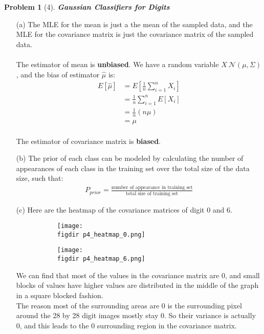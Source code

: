 \documentclass[11pt]{article}
\theoremstyle{quest}
\newtheorem*{question}{Problem}
\newcommand{\figdir}{../figures/}
\begin{document}
\begin{question}[4]
\textbf{Gaussian Classifiers for Digits}
\end{question}
\begin{itemize}
\item[(a)]
The MLE for the mean is just a the mean of the sampled data, and the MLE for the covariance matrix is just the covariance matrix of the sampled data.\\\\
The estimator of mean is \textbf{unbiased}. We have a random variable $X ~ \mathcal{N}(\mu, \Sigma)$, and the bias of estimator $\hat{\mu}$ is:
\begin{align*}
E[\hat{\mu}] &= E[\frac{1}{n}\sum_{i=1}^{n}X_i]\\
	 				   &= \frac{1}{n}\sum_{i=1}^{n}E[X_i]\\
	 				   &= \frac{1}{n}(n\mu)\\
	 				   &= \mu
\end{align*}
\\
The estimator of covariance matrix is \textbf{biased}.
\item[(b)]
The prior of each class can be modeled by calculating the number of appearances of each class in the training set over the total size of the data size, such that:
\begin{align*}
P_{prior} = \frac{\mbox{number of appearance in training set}}{\mbox{total size of training set}}
\end{align*}
\item[(c)]
Here are the heatmap of the covariance matrices of digit 0 and 6.
\begin{figure}[H]
\centering
\begin{subfigure}{.5\textwidth}
  \centering
  \texttt{[image: \\figdir p4\_heatmap\_0.png]}
\end{subfigure}%
\begin{subfigure}{.5\textwidth}
  \centering
  \texttt{[image: \\figdir p4\_heatmap\_6.png]}
\end{subfigure}
\end{figure}
We can find that most of the values in the covariance matrix are 0, and small blocks of values have higher values are distributed in the middle of the graph in a square blocked fashion.\\
The reason most of the surrounding areas are 0 is the surrounding pixel around the 28 by 28 digit images mostly stay 0. So their variance is actually 0, and this leads to the 0 surrounding region in the covariance matrix.\\

\end{itemize}
\end{document}
